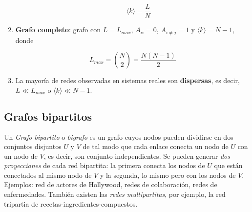 \documentclass[10pt,spanish, landscape, twocolumn]{article}
\begin{document}
\begin{enumerate}[\color{temados}{$\dashrightarrow$}]
\begin{enumerate}[---]
        \begin{displaymath}
            \langle k \rangle = \frac{L}{N}
        \end{displaymath}
    \end{enumerate}

    \item \textbf{\textcolor{temados}{Grafo completo}}: grafo con $L = L_{max}$, $A_{ii} = 0$, $A_{i \neq j} = 1$ y $\langle k \rangle = N-1$, donde

    \begin{displaymath}
        L_{max} = \binom{N}{2} = \frac{N(N-1)}{2}
    \end{displaymath}

    \item La mayoría de redes observadas en sistemas reales son \textbf{\textcolor{temados}{dispersas}}, es decir, $L \ll L_{max}$ o $\langle k \rangle \ll N-1$.
\end{enumerate}

\subsection{\textcolor{temados}Grafos bipartitos}
Un \textit{\textcolor{temados}{Grafo bipartito}} o \textit{\textcolor{temados}{bigrafo}} es un grafo cuyos nodos pueden dividirse en dos conjuntos disjuntos $U$ y $V$ de tal modo que cada enlace conecta un nodo de $U$ con un nodo de $V$, es decir, son conjunto independientes. Se pueden generar \textit{\textcolor{temados}{dos proyecciones}} de cada red bipartita: la primera conecta los nodos de $U$ que están conectados al mismo nodo de $V$ y la segunda, lo mismo pero con los nodos de $V$. Ejemplos: red de actores de Hollywood, redes de colaboración, redes de enfermedades. También existen las \textit{\textcolor{temados}{redes multipartitas}}, por ejemplo, la red tripartia de recetas-ingredientes-compuestos.
\end{document}
